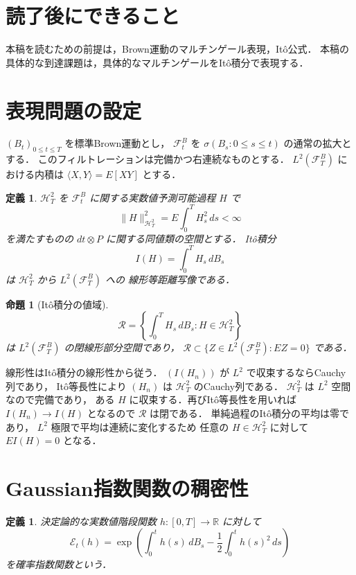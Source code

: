 \documentclass[a5paper,10pt,onecolumn]{jsarticle}
\makeatletter
\theoremstyle{mathnotetheorem}
\newtheorem{definition}[theorem]{定義}
\newtheorem{proposition}[theorem]{命題}
\renewcommand{\proofname}{証明}
\renewenvironment{proof}[1][\proofname]{%
  \par\pushQED{\qed}\normalfont\topsep4\p@\@plus2\p@\relax
  \trivlist\item[\hskip\labelsep\bfseries #1]\ignorespaces
}{\popQED\endtrivlist\@endpefalse}
\newcommand{\norm}[1]{\lVert #1\rVert}
\makeatother
\begin{document}
\section*{読了後にできること}
本稿を読むための前提は，Brown運動のマルチンゲール表現，Itô公式．
本稿の具体的な到達課題は，具体的なマルチンゲールをItô積分で表現する．

\section{表現問題の設定}

$(B_t)_{0\le t\le T}$ を標準Brown運動とし，
$\mathcal F_t^B$ を
$\sigma(B_s:0\le s\le t)$ の通常の拡大とする．
このフィルトレーションは完備かつ右連続なものとする．
$L^2(\mathcal F_T^B)$ における内積は
$\langle X,Y\rangle=E[XY]$ とする．

\begin{definition}
$\mathcal H^2_T$ を
$\mathcal F_t^B$ に関する実数値予測可能過程 $H$ で
\[
 \norm H_{\mathcal H^2_T}^2
 =E\int_0^T H_s^2\,ds<\infty
\]
を満たすものの $dt\otimes P$ に関する同値類の空間とする．
It\^o積分
\[
 I(H)=\int_0^TH_s\,dB_s
\]
は $\mathcal H^2_T$ から $L^2(\mathcal F_T^B)$ への
線形等距離写像である．
\end{definition}

\begin{proposition}[It\^o積分の値域]\label{prop:range}
\[
 \mathcal R=\left\{\int_0^TH_s\,dB_s:
 H\in\mathcal H^2_T\right\}
\]
は $L^2(\mathcal F_T^B)$ の閉線形部分空間であり，
$\mathcal R\subset\{Z\in L^2(\mathcal F_T^B):EZ=0\}$ である．
\end{proposition}
\begin{proof}
線形性はIt\^o積分の線形性から従う．
$(I(H_n))$ が $L^2$ で収束するならCauchy列であり，
It\^o等長性により $(H_n)$ は
$\mathcal H^2_T$ のCauchy列である．
$\mathcal H^2_T$ は $L^2$ 空間なので完備であり，
ある $H$ に収束する．再びIt\^o等長性を用いれば
$I(H_n)\to I(H)$ となるので $\mathcal R$ は閉である．
単純過程のIt\^o積分の平均は零であり，
$L^2$ 極限で平均は連続に変化するため
任意の $H\in\mathcal H^2_T$ に対して $EI(H)=0$ となる．
\end{proof}

\section{Gaussian指数関数の稠密性}

\begin{definition}
決定論的な実数値階段関数 $h:[0,T]\to\mathbb R$ に対して
\[
 \mathcal E_t(h)=
 \exp\!\left(\int_0^t h(s)\,dB_s
   -\frac12\int_0^t h(s)^2\,ds\right)
\]
を\emph{確率指数関数}という．
\end{definition}
\end{document}
